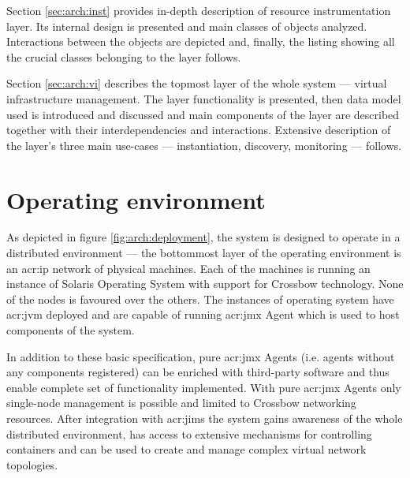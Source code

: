 \documentclass[11pt,openany]{book}
\begin{document}
    Section \ref{sec:arch:inst} provides in-depth description of resource instrumentation layer. Its internal design is
    presented and main classes of objects analyzed. Interactions between the objects are depicted and, finally, the
    listing showing all the crucial classes belonging to the layer follows.

    Section \ref{sec:arch:vi} describes the topmost layer of the whole system --- virtual infrastructure management. The
    layer functionality is presented, then data model used is introduced and discussed and main components of the layer
    are described together with their interdependencies and interactions. Extensive description of the layer's three
    main use-cases --- instantiation, discovery, monitoring --- follows.


    \section{Operating environment}
    \label{sec:arch:env}

      As depicted in figure \ref{fig:arch:deployment}, the system is designed to operate in a distributed environment
      --- the bottommost layer of the operating environment is an \gls{acr:ip} network of physical machines. Each of the
      machines is running an instance of Solaris Operating System with support for Crossbow technology. None of the
      nodes is favoured over the others. The instances of operating system have \gls{acr:jvm} deployed and are capable
      of running \gls{acr:jmx} Agent which is used to host components of the system.

      In addition to these basic specification, pure \gls{acr:jmx} Agents (i.e. agents without any components registered) can be
      enriched with third-party software and thus enable complete set of functionality implemented. With pure \gls{acr:jmx} Agents
      only single-node management is possible and limited to Crossbow networking resources. After integration with \gls{acr:jims}
      the system gains awareness of the whole distributed environment, has access to extensive mechanisms for
      controlling containers and can be used to create and manage complex virtual network topologies.
    
\end{document}
